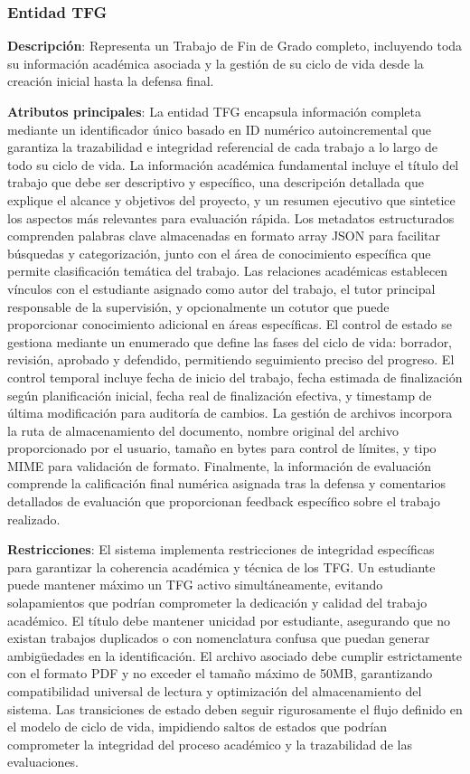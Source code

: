 \documentclass[12pt,a4paper,oneside]{report}
\begin{document}
\subsubsection{Entidad TFG}\label{entidad-tfg}

\textbf{Descripción}: Representa un Trabajo de Fin de Grado completo, incluyendo toda su información académica asociada y la gestión de su ciclo de vida desde la creación inicial hasta la defensa final.

\textbf{Atributos principales}: La entidad TFG encapsula información completa mediante un identificador único basado en ID numérico autoincremental que garantiza la trazabilidad e integridad referencial de cada trabajo a lo largo de todo su ciclo de vida. La información académica fundamental incluye el título del trabajo que debe ser descriptivo y específico, una descripción detallada que explique el alcance y objetivos del proyecto, y un resumen ejecutivo que sintetice los aspectos más relevantes para evaluación rápida. Los metadatos estructurados comprenden palabras clave almacenadas en formato array JSON para facilitar búsquedas y categorización, junto con el área de conocimiento específica que permite clasificación temática del trabajo. Las relaciones académicas establecen vínculos con el estudiante asignado como autor del trabajo, el tutor principal responsable de la supervisión, y opcionalmente un cotutor que puede proporcionar conocimiento adicional en áreas específicas. El control de estado se gestiona mediante un enumerado que define las fases del ciclo de vida: borrador, revisión, aprobado y defendido, permitiendo seguimiento preciso del progreso. El control temporal incluye fecha de inicio del trabajo, fecha estimada de finalización según planificación inicial, fecha real de finalización efectiva, y timestamp de última modificación para auditoría de cambios. La gestión de archivos incorpora la ruta de almacenamiento del documento, nombre original del archivo proporcionado por el usuario, tamaño en bytes para control de límites, y tipo MIME para validación de formato. Finalmente, la información de evaluación comprende la calificación final numérica asignada tras la defensa y comentarios detallados de evaluación que proporcionan feedback específico sobre el trabajo realizado.

\textbf{Restricciones}: El sistema implementa restricciones de integridad específicas para garantizar la coherencia académica y técnica de los TFG. Un estudiante puede mantener máximo un TFG activo simultáneamente, evitando solapamientos que podrían comprometer la dedicación y calidad del trabajo académico. El título debe mantener unicidad por estudiante, asegurando que no existan trabajos duplicados o con nomenclatura confusa que puedan generar ambigüedades en la identificación. El archivo asociado debe cumplir estrictamente con el formato PDF y no exceder el tamaño máximo de 50MB, garantizando compatibilidad universal de lectura y optimización del almacenamiento del sistema. Las transiciones de estado deben seguir rigurosamente el flujo definido en el modelo de ciclo de vida, impidiendo saltos de estados que podrían comprometer la integridad del proceso académico y la trazabilidad de las evaluaciones.
\end{document}
